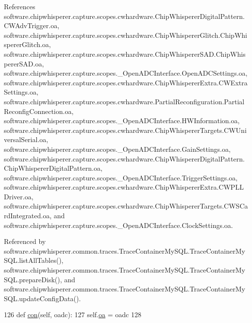 References software.\+chipwhisperer.\+capture.\+scopes.\+cwhardware.\+Chip\+Whisperer\+Digital\+Pattern.\+C\+W\+Adv\+Trigger.\+oa, software.\+chipwhisperer.\+capture.\+scopes.\+cwhardware.\+Chip\+Whisperer\+Glitch.\+Chip\+Whisperer\+Glitch.\+oa, software.\+chipwhisperer.\+capture.\+scopes.\+cwhardware.\+Chip\+Whisperer\+S\+A\+D.\+Chip\+Whisperer\+S\+A\+D.\+oa, software.\+chipwhisperer.\+capture.\+scopes.\+\_\+\+Open\+A\+D\+C\+Interface.\+Open\+A\+D\+C\+Settings.\+oa, software.\+chipwhisperer.\+capture.\+scopes.\+cwhardware.\+Chip\+Whisperer\+Extra.\+C\+W\+Extra\+Settings.\+oa, software.\+chipwhisperer.\+capture.\+scopes.\+cwhardware.\+Partial\+Reconfiguration.\+Partial\+Reconfig\+Connection.\+oa, software.\+chipwhisperer.\+capture.\+scopes.\+\_\+\+Open\+A\+D\+C\+Interface.\+H\+W\+Information.\+oa, software.\+chipwhisperer.\+capture.\+scopes.\+cwhardware.\+Chip\+Whisperer\+Targets.\+C\+W\+Universal\+Serial.\+oa, software.\+chipwhisperer.\+capture.\+scopes.\+\_\+\+Open\+A\+D\+C\+Interface.\+Gain\+Settings.\+oa, software.\+chipwhisperer.\+capture.\+scopes.\+cwhardware.\+Chip\+Whisperer\+Digital\+Pattern.\+Chip\+Whisperer\+Digital\+Pattern.\+oa, software.\+chipwhisperer.\+capture.\+scopes.\+\_\+\+Open\+A\+D\+C\+Interface.\+Trigger\+Settings.\+oa, software.\+chipwhisperer.\+capture.\+scopes.\+cwhardware.\+Chip\+Whisperer\+Extra.\+C\+W\+P\+L\+L\+Driver.\+oa, software.\+chipwhisperer.\+capture.\+scopes.\+cwhardware.\+Chip\+Whisperer\+Targets.\+C\+W\+S\+Card\+Integrated.\+oa, and software.\+chipwhisperer.\+capture.\+scopes.\+\_\+\+Open\+A\+D\+C\+Interface.\+Clock\+Settings.\+oa.



Referenced by software.\+chipwhisperer.\+common.\+traces.\+Trace\+Container\+My\+S\+Q\+L.\+Trace\+Container\+My\+S\+Q\+L.\+list\+All\+Tables(), software.\+chipwhisperer.\+common.\+traces.\+Trace\+Container\+My\+S\+Q\+L.\+Trace\+Container\+My\+S\+Q\+L.\+prepare\+Disk(), and software.\+chipwhisperer.\+common.\+traces.\+Trace\+Container\+My\+S\+Q\+L.\+Trace\+Container\+My\+S\+Q\+L.\+update\+Config\+Data().


\begin{DoxyCode}
126     \textcolor{keyword}{def }\hyperlink{classsoftware_1_1chipwhisperer_1_1capture_1_1scopes_1_1cwhardware_1_1PartialReconfiguration_1_1PartialReconfigConnection_ac4c8c8aa8531bf3dccc48e4fbc050a0f}{con}(self, oadc):
127         self.\hyperlink{classsoftware_1_1chipwhisperer_1_1capture_1_1scopes_1_1cwhardware_1_1PartialReconfiguration_1_1PartialReconfigConnection_a13cdf006aa85db7e688df730b1904b1b}{oa} = oadc
128 
\end{DoxyCode}
\hypertarget{classsoftware_1_1chipwhisperer_1_1capture_1_1scopes_1_1cwhardware_1_1PartialReconfiguration_1_1PartialReconfigConnection_a6dac4abcc605a21c7acf894b52fdbcb2}{}

